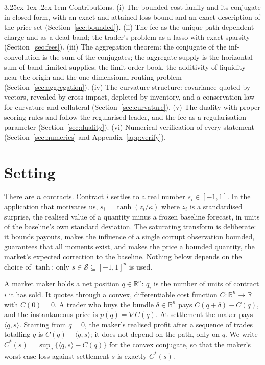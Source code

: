 \documentclass[11pt]{article}
\makeatletter
\renewcommand\paragraph{\@startsection{paragraph}{4}{\z@}%
  {3.25ex \@plus1ex \@minus.2ex}{-1em}%
  {\normalfont\normalsize\itshape}}
\theoremstyle{definition}
\theoremstyle{remark}
\newcommand{\R}{\mathbb{R}}
\newcommand{\ip}[2]{\langle #1,#2\rangle}
\makeatother
\begin{document}
\paragraph{Contributions.} (i) The bounded cost family and its conjugate in closed form, with an exact and attained
loss bound and an exact description of the price set (Section~\ref{sec:bounded}). (ii) The fee as the unique
path-dependent charge and as a dead band; the trader's problem as a lasso with exact sparsity
(Section~\ref{sec:fees}). (iii) The aggregation theorem: the conjugate of the inf-convolution is the sum of the
conjugates; the aggregate supply is the horizontal sum of band-limited supplies; the limit order book, the
additivity of liquidity near the origin and the one-dimensional routing problem (Section~\ref{sec:aggregation}).
(iv) The curvature structure: covariance quoted by vectors, revealed by cross-impact, depleted by inventory, and a
conservation law for curvature and collateral (Section~\ref{sec:curvature}). (v) The duality with proper scoring
rules and follow-the-regularised-leader, and the fee as a regularisation parameter (Section~\ref{sec:duality}).
(vi) Numerical verification of every statement (Section~\ref{sec:numerics} and Appendix~\ref{app:verify}).

\section{Setting}\label{sec:setting}

There are $n$ contracts. Contract $i$ settles to a real number $s_i\in[-1,1]$. In the application that motivates
us, $s_i=\tanh(z_i/\kappa)$ where $z_i$ is a standardised surprise, the realised value of a quantity minus a frozen
baseline forecast, in units of the baseline's own standard deviation. The saturating transform is deliberate: it
bounds payouts, makes the influence of a single corrupt observation bounded, guarantees that all moments exist, and
makes the price a bounded quantity, the market's expected correction to the baseline. Nothing
below depends on the choice of $\tanh$; only $s\in\mathcal{S}\subseteq[-1,1]^{n}$ is used.

A market maker holds a net position $q\in\R^{n}$: $q_i$ is the number of units of contract $i$ it has sold. It
quotes through a convex, differentiable cost function $C:\R^{n}\to\R$ with $C(0)=0$. A trader who buys the bundle
$\delta\in\R^{n}$ pays $C(q+\delta)-C(q)$, and the instantaneous price is $p(q)=\nabla C(q)$. At settlement the
maker pays $\ip{q}{s}$. Starting from $q=0$, the maker's realised profit after a sequence of trades totalling $q$ is
$C(q)-\ip{q}{s}$; it does not depend on the path, only on $q$. We write $C^{*}(s)=\sup_{q}\{\ip{q}{s}-C(q)\}$ for
the convex conjugate, so that the maker's worst-case loss against settlement $s$ is exactly $C^{*}(s)$.
\end{document}
